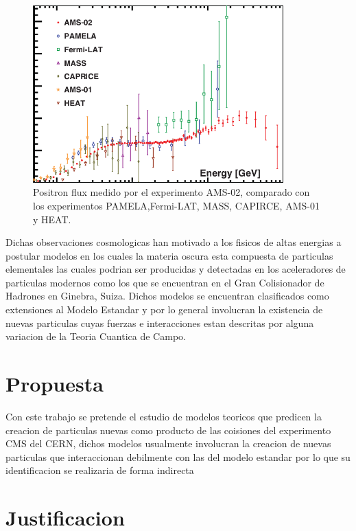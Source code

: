 \begin{figure}
\begin{center}
  \includegraphics[width=3.8in]{AMS_positronflux.png}
  \caption{Positron flux medido por el experimento AMS-02, comparado con los experimentos PAMELA,Fermi-LAT, MASS, CAPIRCE, AMS-01 y HEAT.}
  \label{fig:AMS_positron}
\end{center}
\end{figure}

Dichas observaciones cosmologicas han motivado a los fisicos de altas energias a postular modelos en los cuales la materia oscura esta compuesta de particulas elementales las cuales podrian ser producidas y detectadas en los aceleradores de particulas modernos como los que se encuentran en el Gran Colisionador de Hadrones en Ginebra, Suiza.  Dichos modelos se encuentran clasificados como extensiones al Modelo Estandar y por lo general involucran la existencia de nuevas particulas cuyas fuerzas e interacciones estan descritas por alguna variacion de la Teoria Cuantica de Campo. 

\chapter{Propuesta}

Con este trabajo se pretende el estudio de modelos teoricos que predicen la creacion de particulas nuevas como producto de las coisiones del experimento CMS del CERN, dichos modelos usualmente involucran la creacion de nuevas particulas que interaccionan debilmente con las del modelo estandar por lo que su identificacion se realizaria de forma indirecta


\chapter{Justificacion}



